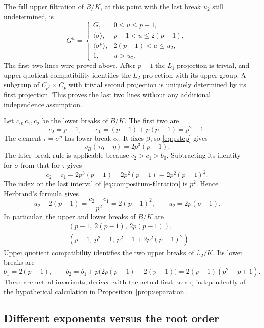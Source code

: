 The full upper filtration of \(B/K\), at this point with
the last break \(u_2\) still undetermined, is
\begin{equation}\label{eq:compositum-filtration}
 G^u=
 \begin{cases}
 G,&0\le u\le p-1,\\
 \langle\sigma\rangle,&p-1<u\le 2(p-1),\\
 \langle\sigma^p\rangle,&2(p-1)<u\le u_2,\\
 1,&u>u_2.
 \end{cases}
\end{equation}
The first two lines were proved above. After \(p-1\) the
\(L_1\) projection is trivial, and upper quotient
compatibility identifies the \(L_2\) projection with its
upper group. A subgroup of \(C_{p^2}\times C_p\) with
trivial second projection is uniquely determined by its
first projection. This proves the last two lines without
any additional independence assumption.

Let \(c_0,c_1,c_2\) be the lower breaks of \(B/K\).
The first two are
\[
 c_0=p-1,\qquad c_1=(p-1)+p(p-1)=p^2-1.
\]
The element \(\tau=\sigma^p\) has lower break \(c_2\).
It fixes \(\beta\), so \eqref{eq:pstep} gives
\[
 v_B(\tau\eta-\eta)=2p^3(p-1).
\]
The later-break rule is applicable because \(c_2>c_1>b_0\).
Subtracting its identity for \(\sigma\) from that for \(\tau\)
gives
\[
 c_2-c_1=2p^3(p-1)-2p^2(p-1)=2p^2(p-1)^2.
\]
The index on the last interval of
\eqref{eq:compositum-filtration} is \(p^2\).
Hence Herbrand's formula gives
\[
 u_2-2(p-1)=\frac{c_2-c_1}{p^2}=2(p-1)^2,
 \qquad u_2=2p(p-1).
\]
In particular, the upper and lower breaks of \(B/K\) are
\begin{equation}\label{eq:compositum-breaks}
 \begin{aligned}
 &(p-1,\ 2(p-1),\ 2p(p-1)),\\
 &(p-1,\ p^2-1,\ p^2-1+2p^2(p-1)^2).
 \end{aligned}
\end{equation}
Upper quotient compatibility identifies the two upper
breaks of \(L_2/K\). Its lower breaks are
\[
 b_1=2(p-1),\qquad
 b_2=b_1+p\bigl(2p(p-1)-2(p-1)\bigr)
 =2(p-1)(p^2-p+1).
\]
These are actual invariants, derived with the actual first
break, independently of the hypothetical calculation in
Proposition~\ref{prop:separation}.

\subsection{Different exponents versus the root order}

